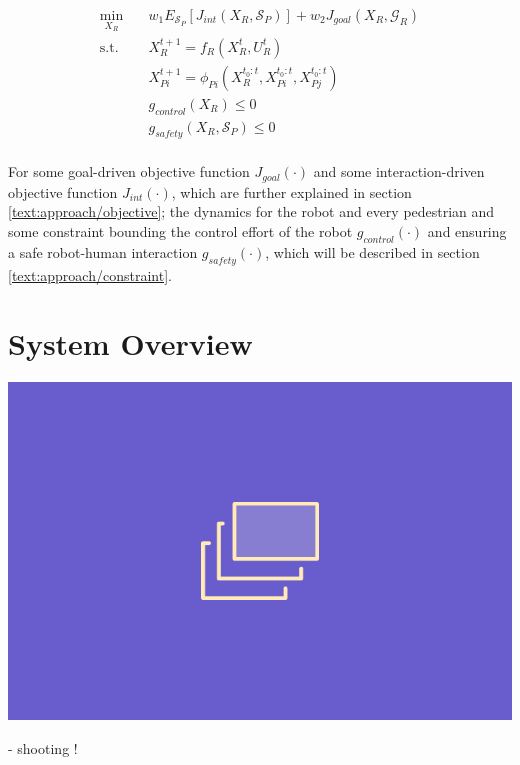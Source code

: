 \begin{align}
\min_{X_R} \quad & w_1 E_{\mathcal{S}_P}[J_{int}(X_R, \mathcal{S}_P)] + w_2 J_{goal}(X_R, \mathcal{G}_R) \\
\textrm{s.t. } \quad & X_R^{t+1} = f_R(X_R^t, U_R^t) \\
& X_{Pi}^{t+1} = \phi_{Pi}(X_R^{t_0:t}, X_{Pi}^{t_0:t}, X_{Pj}^{t_0:t}) \\
& g_{control}(X_R) \leq 0 \\
& g_{safety}(X_R, \mathcal{S}_P) \leq 0 \\
\end{align} 

For some goal-driven objective function $J_{goal}(\cdot)$ and some interaction-driven objective function $J_{int}(\cdot)$, which are further explained in section \ref{text:approach/objective}; the dynamics for the robot and every pedestrian and some constraint bounding the control effort of the robot $g_{control}(\cdot)$ and ensuring a safe robot-human interaction $g_{safety}(\cdot)$, which will be described in section \ref{text:approach/constraint}.

\section{System Overview}
\label{text:approach/overview}


\begin{center}
\includegraphics[width=\imgwidth]{images/placeholder.png}
\label{img:information_flow}
\end{center}

- shooting !

